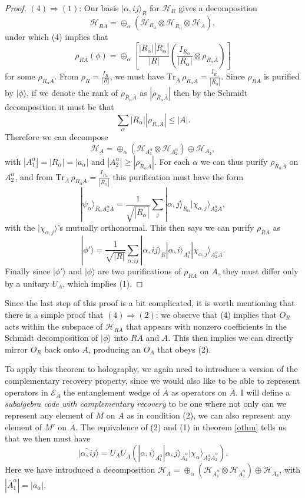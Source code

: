 \documentclass[12pt]{article}
\newcommand{\be}{\begin{equation}}
\newcommand{\ee}{\end{equation}}
\newcommand{\ran}{\rangle}
\newcommand{\Tr}{\mathrm{Tr}}
\newcommand{\wt}{\widetilde}
\newcommand{\Hh}{\mathcal{H}}
\newcommand{\HA}{\mathcal{H}_A}
\newcommand{\HAb}{\mathcal{H}_{\ol{A}}}
\newcommand{\Ab}{\ol{A}}
\newcommand{\ab}{\ol{a}}
\newcommand{\ol}{\overline}
\begin{document}
\begin{proof}
$(4)\Rightarrow (1)$: Our basis $|\alpha,ij\ran_R$ for $\Hh_R$ gives a decomposition 
\be
\Hh_{R\Ab}=\oplus_\alpha\left(\Hh_{R_\alpha}\otimes \Hh_{\ol{R}_\alpha}\otimes\HAb\right),
\ee
under which (4) implies that
\be
\rho_{R\Ab}(\phi)=\oplus_\alpha\left[\frac{|R_\alpha||\ol{R}_\alpha|}{|R|}\left(\frac{I_{R_\alpha}}{|R_\alpha|}\otimes \rho_{\ol{R}_\alpha \Ab}\right)\right]
\ee
for some $\rho_{\ol{R}_\alpha \Ab}$.  From $\rho_R=\frac{I_R}{|R|}$, we must have $\Tr_{\Ab} \,\rho_{\ol{R}_\alpha \Ab}=\frac{I_{\ol{R}_\alpha}}{|\ol{R}_\alpha|}$.  Since $\rho_{R\Ab}$ is purified by $|\phi\ran$, if we denote the rank of $\rho_{\ol{R}_\alpha \Ab}$ as $|\rho_{\ol{R}_\alpha \Ab}|$ then by the Schmidt decomposition it must be that
\be
\sum_\alpha |R_\alpha| |\rho_{\ol{R}_\alpha \Ab}|\leq |A|.
\ee
Therefore we can decompose 
\be
\HA=\oplus_\alpha\left(\Hh_{A_1^\alpha}\otimes \Hh_{A_2^\alpha}\right)\oplus \Hh_{A_3},
\ee
with $|A_1^\alpha|=|R_\alpha|=|a_\alpha|$ and $|A_2^\alpha|\geq |\rho_{\ol{R}_\alpha \Ab}|$.  For each $\alpha$ we can thus purify $\rho_{\ol{R}_\alpha \Ab}$ on $A_2^\alpha$, and from $\Tr_{\Ab} \,\rho_{\ol{R}_\alpha \Ab}=\frac{I_{\ol{R}_\alpha}}{|\ol{R}_\alpha|}$ this purification must have the form
\be
|\psi_\alpha\ran_{\ol{R}_\alpha A_2^\alpha \Ab}=\frac{1}{\sqrt{|\ol{R}_\alpha|}}\sum_j|\alpha,j\ran_{\ol{R}_\alpha}|\chi_{\alpha,j}\ran_{A_2^\alpha \Ab},
\ee
with the $|\chi_{\alpha,j}\ran$'s mutually orthonormal.  This then says we can purify $\rho_{R\Ab}$ as
\be
|\phi'\ran=\frac{1}{\sqrt{|R|}}\sum_{\alpha,ij}|\alpha,ij\ran_R|\alpha,i\ran_{A_1^\alpha}|\chi_{\alpha,j}\ran_{A_2^\alpha\Ab}.
\ee
Finally since $|\phi'\ran$ and $|\phi\ran$ are two purifications of $\rho_{R\Ab}$ on $A$, they must differ only by a unitary $U_A$, which implies (1).
\end{proof}
Since the last step of this proof is a bit complicated, it is worth mentioning that there is a simple proof \cite{Almheiri:2014lwa} that $(4)\Rightarrow(2)$: we observe that (4) implies that $O_R$ acts within the subspace of $\Hh_{R\Ab}$ that appears with nonzero coefficients in the Schmidt decomposition of $|\phi\ran$ into $R\Ab$ and $A$.  This then implies we can directly mirror $O_R$ back onto $A$, producing an $O_A$ that obeys (2).  

To apply this theorem to holography, we again need to introduce a version of the complementary recovery property, since we would also like to be able to represent operators in $\mathcal{E}_{\Ab}$ the entanglement wedge of $\Ab$ as operators on $\Ab$.  I will define a \textit{subalgebra code with complementary recovery} to be one where not only can we represent any element of $M$ on $A$ as in condition (2), we can also represent any element of $M'$ on $\Ab$.  The equivalence of (2) and (1) in theorem \eqref{othm} tells us that we then must have
\be\label{ocr}
|\wt{\alpha,ij}\ran=U_A U_{\Ab}\left(|\alpha,i\ran_{A_1^\alpha}|\alpha,j\ran_{\Ab_1^\alpha}|\chi_\alpha\ran_{A_2^\alpha \Ab_2^\alpha}\right).
\ee
Here we have introduced a decomposition $\HAb=\oplus_\alpha \left(\Hh_{\Ab_1^\alpha}\otimes \Hh_{\Ab_2^\alpha}\right)\oplus \Hh_{\Ab_3}$, with $|\Ab_1^\alpha|=|\ab_\alpha|$.  
\end{document}
